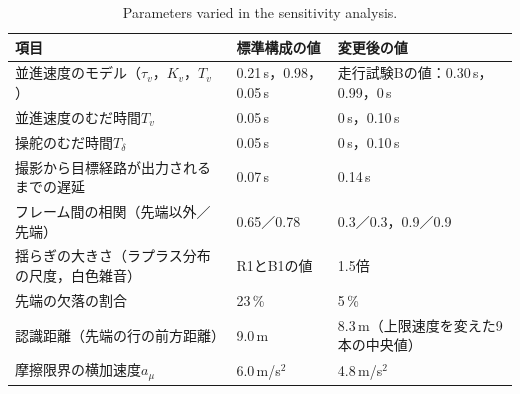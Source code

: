 \begin{table}[!htbp]
  \centering
  \caption{Parameters varied in the sensitivity analysis.}
  \label{tab:sens_cond}
  \footnotesize
  \begin{lrbox}{\tblbox}\setlength{\tabcolsep}{4pt}\begin{tabular}{L{5.6cm}L{4.0cm}L{4.8cm}}
    \toprule
    項目 & 標準構成の値 & 変更後の値 \\
    \midrule
    並進速度のモデル（$\tau_v$，$K_v$，$T_v$） & 0.21\,s，0.98，0.05\,s & 走行試験Bの値：0.30\,s，0.99，0\,s \\
    並進速度のむだ時間$T_v$ & 0.05\,s & 0\,s，0.10\,s \\
    操舵のむだ時間$T_\delta$ & 0.05\,s & 0\,s，0.10\,s \\
    撮影から目標経路が出力されるまでの遅延 & 0.07\,s & 0.14\,s \\
    フレーム間の相関（先端以外／先端） & 0.65／0.78 & 0.3／0.3，0.9／0.9 \\
    揺らぎの大きさ（ラプラス分布の尺度，白色雑音） & R1とB1の値 & 1.5倍 \\
    先端の欠落の割合 & 23\,\% & 5\,\% \\
    認識距離（先端の行の前方距離） & 9.0\,m & 8.3\,m（上限速度を変えた9本の中央値） \\
    摩擦限界の横加速度$a_\mu$ & 6.0\,m/s$^2$ & 4.8\,m/s$^2$ \\
    \bottomrule
  \end{tabular}\end{lrbox}\usebox{\tblbox}
\end{table}

